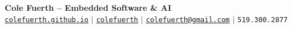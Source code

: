 \begin{center}
    \textbf{\Huge Cole Fuerth -- Embedded Software \& AI} \\ \vspace{5pt}
    \hspace{1pt} \faGlobe \hspace{2pt} \href{https://colefuerth.github.io/}{\texttt{colefuerth.github.io}} \hspace{1pt} $|$
    \hspace{1pt} \faGithub \hspace{2pt} \href{https://github.com/colefuerth}{\texttt{colefuerth}} \hspace{1pt} $|$
    \hspace{1pt} \faEnvelope \hspace{2pt} \href{mailto::colefuerth@gmail.com}{\texttt{colefuerth@gmail.com}} \hspace{1pt} $|$
    \small \faPhone* \texttt{519.300.2877}
    \\ \vspace{-3pt}
  \end{center}